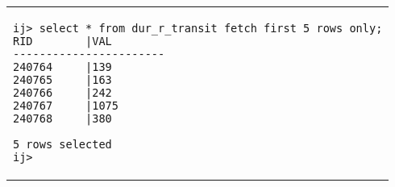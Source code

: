 \begin{tabular}{p{}}
\begin{verbatim}
ij> select * from dur_r_transit fetch first 5 rows only;
RID        |VAL
-----------------------
240764     |139
240765     |163
240766     |242
240767     |1075
240768     |380

5 rows selected
ij>
\end{verbatim}\\
\end{tabular}
